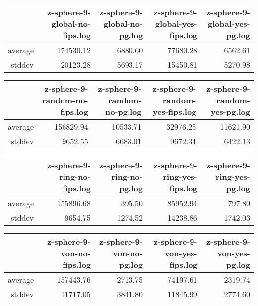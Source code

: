 \begin{table}[ht]
\centering
\begin{tabular}{rrrrr}
  \hline
 & z-sphere-9-global-no-fips.log & z-sphere-9-global-no-pg.log & z-sphere-9-global-yes-fips.log & z-sphere-9-global-yes-pg.log \\ 
  \hline
average & 174530.12 & 6880.60 & 77680.28 & 6562.61 \\ 
  stddev & 20123.28 & 5693.17 & 15450.81 & 5270.98 \\ 
   \hline
\end{tabular}
\end{table}
\begin{table}[ht]
\centering
\begin{tabular}{rrrrr}
  \hline
 & z-sphere-9-random-no-fips.log & z-sphere-9-random-no-pg.log & z-sphere-9-random-yes-fips.log & z-sphere-9-random-yes-pg.log \\ 
  \hline
average & 156829.94 & 10533.71 & 32976.25 & 11621.90 \\ 
  stddev & 9652.55 & 6683.01 & 9672.34 & 6422.13 \\ 
   \hline
\end{tabular}
\end{table}
\begin{table}[ht]
\centering
\begin{tabular}{rrrrr}
  \hline
 & z-sphere-9-ring-no-fips.log & z-sphere-9-ring-no-pg.log & z-sphere-9-ring-yes-fips.log & z-sphere-9-ring-yes-pg.log \\ 
  \hline
average & 155896.68 & 395.50 & 85952.94 & 797.80 \\ 
  stddev & 9654.75 & 1274.52 & 14238.86 & 1742.03 \\ 
   \hline
\end{tabular}
\end{table}
\begin{table}[ht]
\centering
\begin{tabular}{rrrrr}
  \hline
 & z-sphere-9-von-no-fips.log & z-sphere-9-von-no-pg.log & z-sphere-9-von-yes-fips.log & z-sphere-9-von-yes-pg.log \\ 
  \hline
average & 157443.76 & 2713.75 & 74197.61 & 2319.74 \\ 
  stddev & 11717.05 & 3841.80 & 11845.99 & 2774.60 \\ 
   \hline
\end{tabular}
\end{table}
